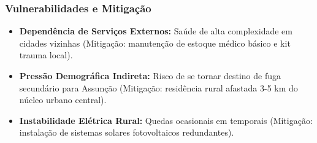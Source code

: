 \subsubsection{Vulnerabilidades e
Mitigação}

\begin{itemize}
\tightlist
\item
  \textbf{Dependência de Serviços Externos:} Saúde de alta complexidade
  em cidades vizinhas (Mitigação: manutenção de estoque médico básico e
  kit trauma local).
\item
  \textbf{Pressão Demográfica Indireta:} Risco de se tornar destino de
  fuga secundário para Assunção (Mitigação: residência rural afastada
  3-5 km do núcleo urbano central).
\item
  \textbf{Instabilidade Elétrica Rural:} Quedas ocasionais em temporais
  (Mitigação: instalação de sistemas solares fotovoltaicos redundantes).
\end{itemize}

